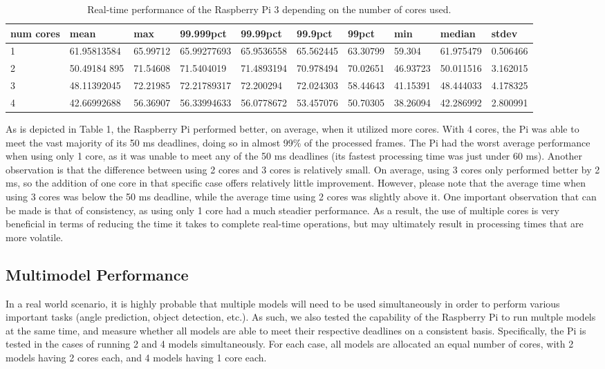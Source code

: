 \documentclass[10pt, conference]{IEEEtran}
\begin{document}
\begin{table}
  \begin{tabular} {| l | l | l | l | l | l | l | l | l | l |}
    \hline
    \textbf{num cores} & \textbf{mean} & \textbf{max} & \textbf{99.999pct} & \textbf{99.99pct} & 
      \textbf{99.9pct} & \textbf{99pct} & \textbf{min} & \textbf{median} & \textbf{stdev} \\ \hline 
    1 & 61.95813584 & 65.99712 & 65.99277693 & 65.9536558 & 65.562445 & 63.30799 & 59.304 & 61.975479 & 
      0.506466 \\ \hline
    2 & 50.49184 895 & 71.54608 & 71.5404019 & 71.4893194 & 70.978494 & 70.02651 & 46.93723 & 50.011516 & 
      3.162015 \\ \hline
    3 & 48.11392045 & 72.21985 & 72.21789317 & 72.200294 & 72.024303 & 58.44643 & 41.15391 & 48.444033 & 
      4.178325 \\ \hline
    4 & 42.66992688 & 56.36907 & 56.33994633 & 56.0778672 & 53.457076 & 50.70305 & 38.26094 & 42.286992 & 
      2.800991 \\
    \hline
  \end{tabular}
  \caption{Real-time performance of the Raspberry Pi 3 depending on the number of cores used.}
\end{table}

As is depicted in Table 1, the Raspberry Pi performed better, on average, when it utilized more 
cores. With 4 cores, the Pi was able to meet the vast majority of its 50 ms deadlines, doing so in 
almost 99\% of the processed frames. The Pi had the worst average performance when using only 1 core, 
as it was unable to meet any of the 50 ms deadlines (its fastest processing time was just under 60 
ms). Another observation is that the difference between using 2 cores and 3 cores is relatively 
small. On average, using 3 cores only performed better by 2 ms, so the addition of one core in that 
specific case offers relatively little improvement. However, please note that the average time when 
using 3 cores was below the 50 ms deadline, while the average time using 2 cores was slightly above it. 
One important observation that can be made is that of consistency, as using only 1 core had a much 
steadier performance. As a result, the use of multiple cores is very beneficial in terms of reducing 
the time it takes to complete real-time operations, but may ultimately result in processing times 
that are more volatile.

\subsection{Multimodel Performance}
In a real world scenario, it is highly probable that multiple models will need to be used 
simultaneously in order to perform various important tasks (angle prediction, object detection, 
etc.)\cite{}. As such, we also tested the capability of the Raspberry Pi to run multple models at the 
same time, and measure whether all models are able to meet their respective deadlines on a consistent 
basis. Specifically, the Pi is tested in the cases of running 2 and 4 models simultaneously. For each 
case, all models are allocated an equal number of cores, with 2 models having 2 cores each, and 4 
models having 1 core each.
\end{document}
